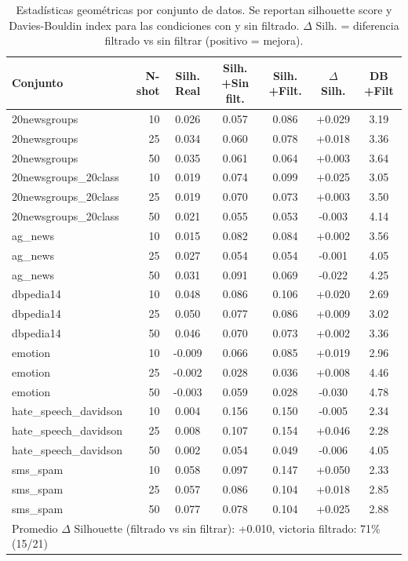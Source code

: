 \begin{table}[htbp]
\centering
\small
\caption{Estadísticas geométricas por conjunto de datos. Se reportan silhouette score y Davies-Bouldin index para las condiciones con y sin filtrado. $\Delta$ Silh. = diferencia filtrado vs sin filtrar (positivo = mejora).}
\label{tab:geometric_per_dataset}
\setlength{\tabcolsep}{4pt}
\begin{tabular}{lrccccc}
\toprule
\textbf{Conjunto} & \textbf{N-shot} & \textbf{Silh. Real} & \textbf{Silh. +Sin filt.} & \textbf{Silh. +Filt.} & \textbf{$\Delta$ Silh.} & \textbf{DB +Filt} \\
\midrule
20newsgroups & 10 & 0.026 & 0.057 & 0.086 & +0.029 & 3.19 \\
20newsgroups & 25 & 0.034 & 0.060 & 0.078 & +0.018 & 3.36 \\
20newsgroups & 50 & 0.035 & 0.061 & 0.064 & +0.003 & 3.64 \\
\midrule
20newsgroups\_20class & 10 & 0.019 & 0.074 & 0.099 & +0.025 & 3.05 \\
20newsgroups\_20class & 25 & 0.019 & 0.070 & 0.073 & +0.003 & 3.50 \\
20newsgroups\_20class & 50 & 0.021 & 0.055 & 0.053 & -0.003 & 4.14 \\
\midrule
ag\_news & 10 & 0.015 & 0.082 & 0.084 & +0.002 & 3.56 \\
ag\_news & 25 & 0.027 & 0.054 & 0.054 & -0.001 & 4.05 \\
ag\_news & 50 & 0.031 & 0.091 & 0.069 & -0.022 & 4.25 \\
\midrule
dbpedia14 & 10 & 0.048 & 0.086 & 0.106 & +0.020 & 2.69 \\
dbpedia14 & 25 & 0.050 & 0.077 & 0.086 & +0.009 & 3.02 \\
dbpedia14 & 50 & 0.046 & 0.070 & 0.073 & +0.002 & 3.36 \\
\midrule
emotion & 10 & -0.009 & 0.066 & 0.085 & +0.019 & 2.96 \\
emotion & 25 & -0.002 & 0.028 & 0.036 & +0.008 & 4.46 \\
emotion & 50 & -0.003 & 0.059 & 0.028 & -0.030 & 4.78 \\
\midrule
hate\_speech\_davidson & 10 & 0.004 & 0.156 & 0.150 & -0.005 & 2.34 \\
hate\_speech\_davidson & 25 & 0.008 & 0.107 & 0.154 & +0.046 & 2.28 \\
hate\_speech\_davidson & 50 & 0.002 & 0.054 & 0.049 & -0.006 & 4.05 \\
\midrule
sms\_spam & 10 & 0.058 & 0.097 & 0.147 & +0.050 & 2.33 \\
sms\_spam & 25 & 0.057 & 0.086 & 0.104 & +0.018 & 2.85 \\
sms\_spam & 50 & 0.077 & 0.078 & 0.104 & +0.025 & 2.88 \\
\midrule
\multicolumn{7}{l}{\small Promedio $\Delta$ Silhouette (filtrado vs sin filtrar): +0.010, victoria filtrado: 71\% (15/21)} \\
\bottomrule
\end{tabular}
\end{table}
